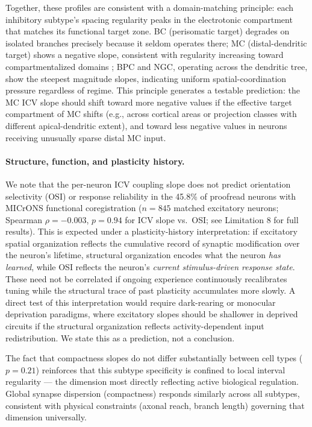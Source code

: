 \documentclass[11pt]{article}
\begin{document}
Together, these profiles are consistent with a domain-matching principle: each inhibitory subtype's spacing regularity peaks in the electrotonic compartment that matches its functional target zone. BC (perisomatic target) degrades on isolated branches precisely because it seldom operates there; MC (distal-dendritic target) shows a negative slope, consistent with regularity increasing toward compartmentalized domains \citep{schneider2023}; BPC and NGC, operating across the dendritic tree, show the steepest magnitude slopes, indicating uniform spatial-coordination pressure regardless of regime. This principle generates a testable prediction: the MC ICV slope should shift toward more negative values if the effective target compartment of MC shifts (e.g., across cortical areas or projection classes with different apical-dendritic extent), and toward less negative values in neurons receiving unusually sparse distal MC input.

\paragraph{Structure, function, and plasticity history.} We note that the per-neuron ICV coupling slope does not predict orientation selectivity (OSI) or response reliability in the 45.8\% of proofread neurons with MICrONS functional coregistration ($n = 845$ matched excitatory neurons; Spearman $\rho = -0.003$, $p = 0.94$ for ICV slope vs.\ OSI; see Limitation 8 for full results). This is expected under a plasticity-history interpretation: if excitatory spatial organization reflects the cumulative record of synaptic modification over the neuron's lifetime, structural organization encodes what the neuron \textit{has learned}, while OSI reflects the neuron's \textit{current stimulus-driven response state}. These need not be correlated if ongoing experience continuously recalibrates tuning while the structural trace of past plasticity accumulates more slowly. A direct test of this interpretation would require dark-rearing or monocular deprivation paradigms, where excitatory slopes should be shallower in deprived circuits if the structural organization reflects activity-dependent input redistribution. We state this as a prediction, not a conclusion.

The fact that compactness slopes do not differ substantially between cell types ($p = 0.21$) reinforces that this subtype specificity is confined to local interval regularity --- the dimension most directly reflecting active biological regulation. Global synapse dispersion (compactness) responds similarly across all subtypes, consistent with physical constraints (axonal reach, branch length) governing that dimension universally.
\end{document}
